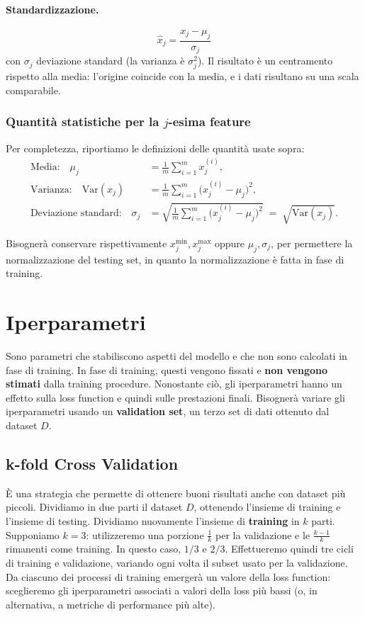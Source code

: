 \paragraph{Standardizzazione.}
\[
  \hat{x}_j = \frac{x_j - \mu_j}{\sigma_j}
\]
con $\sigma_j$ deviazione standard (la varianza \`e $\sigma_j^2$). Il risultato \`e un centramento rispetto alla media: l'origine coincide con la media, e i dati risultano su una scala comparabile.

\subsubsection*{Quantit\`a statistiche per la $j$-esima feature}

Per completezza, riportiamo le definizioni delle quantit\`a usate sopra:
\begin{align*}
  \text{Media:}\quad
  \mu_j &= \frac{1}{m}\sum_{i=1}^m x_j^{(i)},\\[4pt]
  \text{Varianza:}\quad
  \mathrm{Var}(x_j) &= \frac{1}{m}\sum_{i=1}^m \bigl(x_j^{(i)}-\mu_j\bigr)^2,\\[4pt]
  \text{Deviazione standard:}\quad
  \sigma_j &= \sqrt{\frac{1}{m}\sum_{i=1}^m \bigl(x_j^{(i)}-\mu_j\bigr)^2}
           \;=\; \sqrt{\mathrm{Var}(x_j)}.
\end{align*}

Bisogner\`a conservare rispettivamente $x_j^{\min }, x_j^{\max }$ oppure $\mu_j, \sigma_j$, per permettere la normalizzazione del testing set, in quanto la normalizzazione \`e fatta in fase di training.

\section{Iperparametri}

Sono parametri che stabiliscono aspetti del modello e che non sono calcolati in fase di training. In fase di training, questi vengono fissati e \textbf{non vengono stimati} dalla training procedure. Nonostante ci\`o, gli iperparametri hanno un effetto sulla loss function e quindi sulle prestazioni finali. Bisogner\`a variare gli iperparametri usando un \textbf{validation set}, un terzo set di dati ottenuto dal dataset $D$.

\subsection{k-fold Cross Validation}

\`E una strategia che permette di ottenere buoni risultati anche con dataset pi\`u piccoli. Dividiamo in due parti il dataset $D$, ottenendo l'insieme di training e l'insieme di testing. Dividiamo nuovamente l'insieme di \textbf{training} in $k$ parti. Supponiamo $k=3$: utilizzeremo una porzione $\frac{1}{k}$ per la validazione e le $\frac{k-1}{k}$ rimanenti come training. In questo caso, $1/3$ e $2/3$. Effettueremo quindi tre cicli di training e validazione, variando ogni volta il subset usato per la validazione. Da ciascuno dei processi di training emerger\`a un valore della loss function: sceglieremo gli iperparametri associati a valori della loss pi\`u bassi (o, in alternativa, a metriche di performance pi\`u alte).

